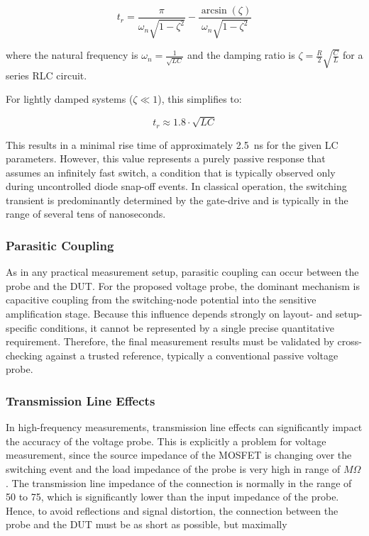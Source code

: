 \begin{equation}
t_r = \frac{\pi}{\omega_n\sqrt{1-\zeta^2}} - \frac{\arcsin(\zeta)}{\omega_n\sqrt{1-\zeta^2}}
\end{equation}

where the natural frequency is $\omega_n = \frac{1}{\sqrt{LC}}$ and the damping ratio is $\zeta = \frac{R}{2}\sqrt{\frac{C}{L}}$ for a series RLC circuit.

For lightly damped systems ($\zeta \ll 1$), this simplifies to:

\begin{equation}
t_r \approx 1.8\cdot\sqrt{LC}
\end{equation}

This results in a minimal rise time of approximately \SI{2.5}{ns} for the given LC parameters.
However, this value represents a purely passive response that assumes an infinitely fast switch, a condition that is typically observed only during uncontrolled diode snap-off events.
In classical operation, the switching transient is predominantly determined by the gate-drive and is typically in the range of several tens of nanoseconds.


\subsubsection*{Parasitic Coupling}
As in any practical measurement setup, parasitic coupling can occur between the probe and the DUT.
For the proposed voltage probe, the dominant mechanism is capacitive coupling from the switching-node potential into the sensitive amplification stage.
Because this influence depends strongly on layout- and setup-specific conditions, it cannot be represented by a single precise quantitative requirement.
Therefore, the final measurement results must be validated by cross-checking against a trusted reference, typically a conventional passive voltage probe.

\subsubsection*{Transmission Line Effects}
In high-frequency measurements, transmission line effects can significantly impact the accuracy of the voltage probe.
This is explicitly a problem for voltage measurement, since the source impedance of the MOSFET is changing over the switching event and the load impedance of the probe is very high in range of ${M\Omega}$.
The transmission line impedance of the connection is normally in the range of \SI{50}{\Omega} to \SI{75}{\Omega}, which is significantly lower than the input impedance of the probe.
Hence, to avoid reflections and signal distortion, the connection between the probe and the DUT must be as short as possible, but maximally

